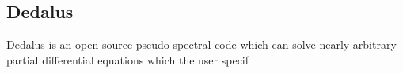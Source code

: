 {\color{purple}    
\subsection{Dedalus}}

Dedalus is an open-source pseudo-spectral code which can solve nearly arbitrary partial differential equations which the user specif 
